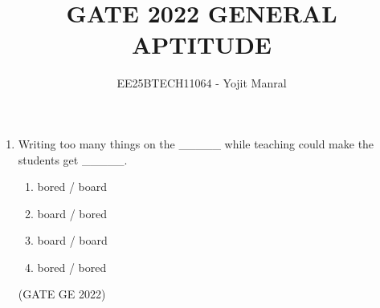 \documentclass[a4paper, 11pt]{article}
\title{GATE 2022 GENERAL APTITUDE}
\author{EE25BTECH11064 - Yojit Manral}
\begin{document}
\maketitle

\begin{enumerate}

\section{\textbf{Q.1 – Q.5 Carry ONE mark each.}}

\item Writing too many things on the \_\_\_\_\_ while teaching could make the students get \_\_\_\_\_.
\begin{enumerate}
    \item bored / board
    \item board / bored
    \item board / board
    \item bored / bored
\end{enumerate}

\hfill (GATE GE 2022)


\end{enumerate}
\end{document}

